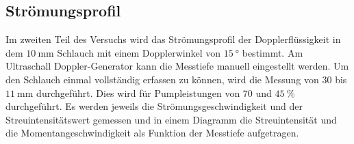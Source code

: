 \subsection{Strömungsprofil}
\label{sub:Strömungsprofil_durch}
Im zweiten Teil des Versuchs wird das Strömungsprofil der Dopplerflüssigkeit in dem $\qty{10}{\milli\meter}$ Schlauch mit einem Dopplerwinkel
von $\qty{15}{\degree}$ bestimmt.
Am Ultraschall Doppler-Generator kann die Messtiefe manuell eingestellt werden. Um den Schlauch einmal vollständig
erfassen zu können, wird die Messung von $30$ bis $\qty{11}{\milli\meter}$ durchgeführt. Dies wird für
Pumpleistungen von $70$ und $\qty{45}{\percent}$ durchgeführt.
Es werden jeweils die Strömungsgeschwindigkeit und der Streuintensitätswert gemessen und in einem Diagramm die
Streuintensität und die Momentangeschwindigkeit als Funktion der Messtiefe aufgetragen.

